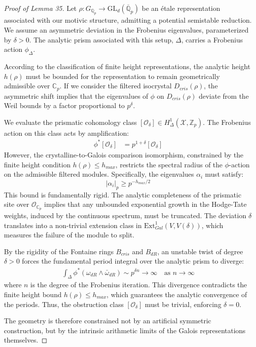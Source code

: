 \documentclass[
]{article}
\begin{document}
\begin{proof}[Proof of Lemma 35]
Let $\rho: G_{\mathbb{Q}_p} \to \mathrm{GL}_d(\overline{\mathbb{Q}}_p)$ be an étale representation associated with our motivic structure, admitting a potential semistable reduction. We assume an asymmetric deviation in the Frobenius eigenvalues, parameterized by $\delta > 0$. The analytic prism associated with this setup, $\Delta$, carries a Frobenius action $\phi_\Delta$.

According to the classification of finite height representations, the analytic height $h(\rho)$ must be bounded for the representation to remain geometrically admissible over $\mathbb{C}_p$. If we consider the filtered isocrystal $D_{cris}(\rho)$, the asymmetric shift implies that the eigenvalues of $\phi$ on $D_{cris}(\rho)$ deviate from the Weil bounds by a factor proportional to $p^\delta$.

We evaluate the prismatic cohomology class $[\mathcal{O}_\delta] \in H^1_{\Delta}(\mathcal{X}, \mathbb{Z}_p)$. The Frobenius action on this class acts by amplification:
\begin{align*}
\phi^* [\mathcal{O}_\delta] &= p^{1 + \delta} [\mathcal{O}_\delta]
\end{align*}
However, the crystalline-to-Galois comparison isomorphism, constrained by the finite height condition $h(\rho) \leq h_{max}$, restricts the spectral radius of the $\phi$-action on the admissible filtered modules. Specifically, the eigenvalues $\alpha_i$ must satisfy:
\begin{equation*}
|\alpha_i|_p \geq p^{-h_{max}/2}
\end{equation*}
This bound is fundamentally rigid. The analytic completeness of the prismatic site over $\mathcal{O}_{\mathbb{C}_p}$ implies that any unbounded exponential growth in the Hodge-Tate weights, induced by the continuous spectrum, must be truncated. The deviation $\delta$ translates into a non-trivial extension class in $\mathrm{Ext}^1_{Gal}(V, V(\delta))$, which measures the failure of the module to split.

By the rigidity of the Fontaine rings $B_{cris}$ and $B_{dR}$, an unstable twist of degree $\delta > 0$ forces the fundamental period integral over the analytic prism to diverge:
\begin{align*}
\int_{\Delta} \phi^* (\omega_{dR} \wedge \bar{\omega}_{dR}) \sim p^{\delta n} \to \infty \quad \text{as } n \to \infty
\end{align*}
where $n$ is the degree of the Frobenius iteration. This divergence contradicts the finite height bound $h(\rho) \leq h_{max}$, which guarantees the analytic convergence of the periods. Thus, the obstruction class $[\mathcal{O}_\delta]$ must be trivial, enforcing $\delta = 0$.

The geometry is therefore constrained not by an artificial symmetric construction, but by the intrinsic arithmetic limits of the Galois representations themselves.
\end{proof}
\end{document}
